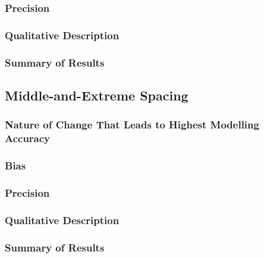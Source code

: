 \documentclass[
12pt, %
twoside,
english]{guelphthesis}
\begin{document}
\hypertarget{precision-time-dec-exp1}{%
\subsubsection{Precision}\label{precision-time-dec-exp1}}

\hypertarget{qualitative-time-dec-exp1}{%
\subsubsection{Qualitative Description}\label{qualitative-time-dec-exp1}}

\hypertarget{summary-of-results-2}{%
\subsubsection{Summary of Results}\label{summary-of-results-2}}

\hypertarget{middle-and-extreme-spacing}{%
\subsection{Middle-and-Extreme Spacing}\label{middle-and-extreme-spacing}}

\hypertarget{nature-change-mid-ext-exp1}{%
\subsubsection{Nature of Change That Leads to Highest Modelling Accuracy}\label{nature-change-mid-ext-exp1}}

\hypertarget{bias-mid-ext-exp1}{%
\subsubsection{Bias}\label{bias-mid-ext-exp1}}

\hypertarget{precision-mid-ext-exp1}{%
\subsubsection{Precision}\label{precision-mid-ext-exp1}}

\hypertarget{qualitative-mid-ext-exp1}{%
\subsubsection{Qualitative Description}\label{qualitative-mid-ext-exp1}}

\hypertarget{summary-of-results-3}{%
\subsubsection{Summary of Results}\label{summary-of-results-3}}
\end{document}
